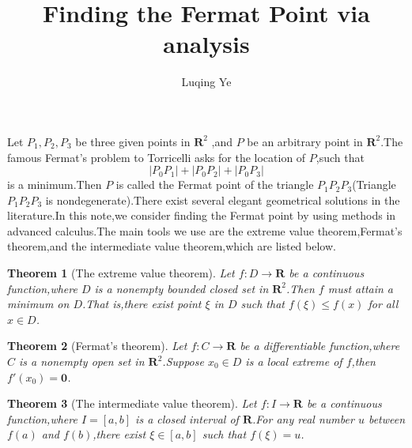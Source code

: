 \documentclass{amsart}
\theoremstyle{plain}
\newtheorem{theorem}{Theorem}
\theoremstyle{definition}
\begin{document}
\title{Finding the Fermat Point via analysis}
\author{Luqing Ye}
\address{College of Science, Hangzhou Normal University,Hangzhou City,Zhejiang Province,China}

\maketitle

 Let $P_1,P_2,P_3$ be three given points in $\mathbf{R}^2$ ,and $P$ be an arbitrary
 point in $\mathbf{R}^2$.The famous Fermat's problem to
 Torricelli asks for the location of $P$,such that 
 \begin{equation*}
   |P_{0}P_1|+|P_{0}P_2|+|P_{0}P_3|
 \end{equation*}
is a minimum.Then $P$ is called the Fermat point of the triangle
$P_1P_2P_3$(Triangle $P_1P_2P_{3}$ is  nondegenerate).There exist several elegant geometrical solutions in the
literature.In this note,we consider finding the Fermat point by
using methods in advanced calculus.The main tools we use are the 
extreme value theorem,Fermat's theorem,and the intermediate value
theorem,which are listed below.
\begin{theorem}[The extreme value theorem]
Let $f:D\to \mathbf{R}$ be a continuous function,where $D$ is a
nonempty bounded closed set in $\mathbf{R}^2$.Then $f$ must attain a minimum
on $D$.That is,there exist point $\xi$ in $D$ such that $f(\xi)\leq
f(x)$ for all $x\in D$.
\end{theorem}
\begin{theorem}[Fermat's theorem]
  Let $f:C\to \mathbf{R}$ be a differentiable function,where $C$ is a
  nonempty open set in $\mathbf{R}^2$.Suppose $x_0\in D$ is a local
  extreme of $f$,then $f'(x_0)=\mathbf{0}$.
\end{theorem}
\begin{theorem}[The intermediate value theorem]
  Let $f:I\to \mathbf{R}$ be a continuous function,where $I=[a,b]$ is a
  closed interval of $\mathbf{R}$.For any real number $u$ between
  $f(a)$ and $f(b)$,there exist $\xi\in [a,b]$ such that $f(\xi)=u$.
\end{theorem}
\end{document}
